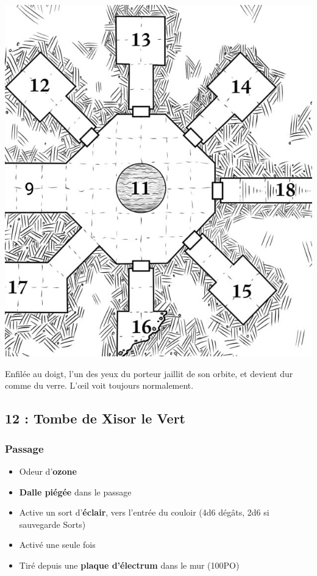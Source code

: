 \begin{center}
  \includegraphics[width=0.9\linewidth]{pics/map_11-18.jpg}
\end{center}

\vfill

\begin{highlight}
Enfilée au doigt, l'un des yeux du porteur jaillit de son orbite, et devient dur comme du verre.
L'\oe il voit toujours normalement.
\end{highlight}


\subsection{12 : Tombe de Xisor le Vert}\label{n2:s12}
\subsubsection{Passage}
\begin{itemize}
    \item Odeur d'\textbf{ozone}
    \item \textbf{Dalle piégée} dans le passage
    \item Active un sort d'\textbf{éclair}, vers l'entrée du couloir (4d6 dégâts, 2d6 si sauvegarde Sorts)
    \item Activé une seule fois
    \item Tiré depuis une \textbf{plaque d'électrum} dans le mur (100PO)
\end{itemize}
